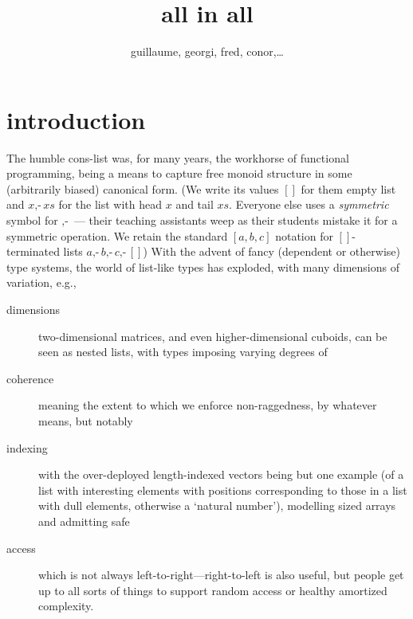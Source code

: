 \documentclass{article}
\begin{document}
\title{all in all}
\author{guillaume, georgi, fred, conor,\ldots}
\maketitle

\newcommand{\nil}{[]}
\newcommand{\cons}{\mbox{$,\!\textrm{-}$}}
\newcommand{\ms}{\mathit{ms}}
\newcommand{\ns}{\mathit{ns}}
\newcommand{\xs}{\mathit{xs}}
\newcommand{\ys}{\mathit{ys}}
\newcommand{\ps}{\mathit{ps}}
\newcommand{\qs}{\mathit{qs}}
\newcommand{\rs}{\mathit{rs}}
\renewcommand{\ss}{\mathit{ss}}
\newcommand{\ts}{\mathit{ts}}
\newcommand{\tss}{\mathit{tss}}
\newcommand{\D}{\mathbf}
\newcommand{\F}{\mathrm}
\newcommand{\Ty}{\mathbf{Ty}}
\newcommand{\Li}{\D{List}}
\newcommand{\All}{\D{All}}
\newcommand{\Alll}{\D{Alll}}
\newcommand{\ListR}{\D{ListR}}
\newcommand{\Matrix}{\D{Matrix}}
\newcommand{\IF}{\;\Leftarrow\;}
\newcommand{\hb}{\!:\!}
\newcommand{\ma}{\mathbf{map}}
\newcommand{\fst}{\mathbf{fst}}
\newcommand{\sel}{\downharpoonleft}
\newcommand{\emp}{\varepsilon}
\newcommand{\from}{\leftarrow}
\newcommand{\st}{\;|\;}
\newcommand{\g}{\:}
\newcommand{\s}{\:}
\newcommand{\siz}{\#}

\section{introduction}

The humble cons-list was, for many years, the workhorse of functional programming, being a means to capture free monoid structure in some (arbitrarily biased) canonical form. (We write its values $\nil$ for them empty list and $x\cons\xs$ for the list with head $x$ and tail $\xs$. Everyone else uses a \emph{symmetric} symbol for $\cons$ --- their teaching assistants weep as their students mistake it for a symmetric operation. We retain the standard $[a,b,c]$ notation for $\nil$-terminated lists $a\cons b\cons c\cons\nil$) With the advent of fancy (dependent or otherwise) type systems, the world of list-like types has exploded, with many dimensions of variation, e.g.,
\begin{description}
\item[dimensions] two-dimensional matrices, and even higher-dimensional cuboids, can be seen as nested lists, with types imposing varying degrees of
\item[coherence] meaning the extent to which we enforce non-raggedness, by whatever means, but notably
\item[indexing] with the over-deployed length-indexed vectors being but one example (of a list with interesting elements with positions corresponding to those in a list with dull elements, otherwise a `natural number'), modelling sized arrays and admitting safe
\item[access] which is not always left-to-right---right-to-left is also useful, but people get up to all sorts of things to support random access or healthy amortized complexity.
\end{description}
\end{document}
